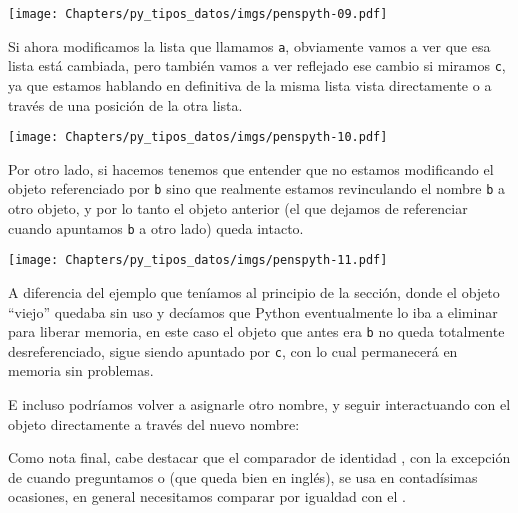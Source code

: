 
\begin{center}
    \texttt{[image: Chapters/py\_tipos\_datos/imgs/penspyth-09.pdf]}
\end{center}

Si ahora modificamos la lista que llamamos \verb|a|, obviamente vamos a ver que esa lista está cambiada, pero también vamos a ver reflejado ese cambio si miramos \verb|c|, ya que estamos hablando en definitiva de la misma lista vista directamente o a través de una posición de la otra lista.


\begin{center}
    \texttt{[image: Chapters/py\_tipos\_datos/imgs/penspyth-10.pdf]}
\end{center}

Por otro lado, si hacemos  tenemos que entender que no estamos modificando el objeto referenciado por \verb|b| sino que realmente estamos revinculando el nombre \verb|b| a otro objeto, y por lo tanto el objeto anterior (el que dejamos de referenciar cuando apuntamos \verb|b| a otro lado) queda intacto. 


\begin{center}
    \texttt{[image: Chapters/py\_tipos\_datos/imgs/penspyth-11.pdf]}
\end{center}

A diferencia del ejemplo que teníamos al principio de la sección, donde el objeto ``viejo'' quedaba sin uso y decíamos que Python eventualmente lo iba a eliminar para liberar memoria, en este caso el objeto que antes era \verb|b| no queda totalmente desreferenciado, sigue siendo apuntado por \verb|c|, con lo cual permanecerá en memoria sin problemas.

E incluso podríamos volver a asignarle otro nombre, y seguir interactuando con el objeto directamente a través del nuevo nombre:


Como nota final, cabe destacar que el comparador de identidad , con la excepción de cuando preguntamos  o  (que queda bien en inglés), se usa en contadísimas ocasiones, en general necesitamos comparar por igualdad con el \mip{==}.


